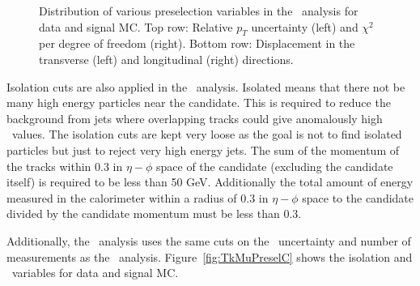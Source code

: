 \begin{figure}
  \caption[Distribution of relative \pt\ uncertainty, $\chi^2$ per degree of freedom, and transverse and longitudinal
displacement in the \tktof\ analysis for data and signal MC.]
{Distribution of various preselection variables in the \tktof\ analysis for data and signal MC.
Top row: Relative $p_T$ uncertainty (left) and $\chi^2$ per degree of freedom (right).
Bottom row: Displacement in the transverse (left) and longitudinal (right) directions.}
    \label{fig:TkMuPreselB}
\end{figure}

Isolation cuts are also applied in the \tktof\ analysis. Isolated means that there not be many high energy particles near the candidate.
This is required to reduce the background from jets where overlapping tracks could give
anomalously high \dedx\ values. The isolation cuts are kept very loose as the goal is not to find isolated particles but just to reject very high energy jets.
The sum of the momentum of the tracks within 0.3 in $\eta-\phi$ space of the candidate (excluding the candidate itself) is required to be less than 50 GeV. Additionally the total
amount of energy measured in the calorimeter within a radius of 0.3 in $\eta-\phi$ space to the candidate divided by the candidate momentum must be less than 0.3.

Additionally, the \tktof\ analysis uses the same cuts on the \invbeta\ uncertainty and number of measurements as the \muononly\ analysis.
Figure~\ref{fig:TkMuPreselC} shows the isolation and \invbeta\ variables for data and signal MC.

